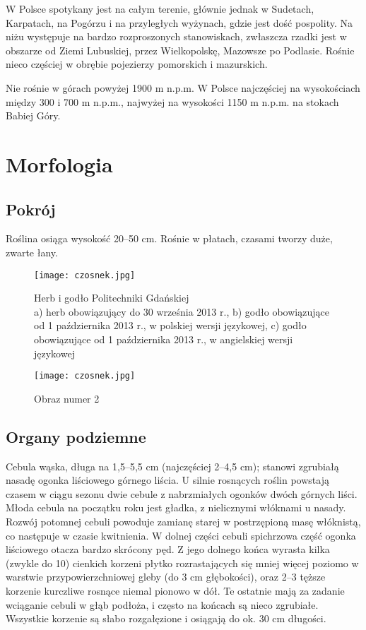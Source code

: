 W Polsce spotykany jest na całym terenie, głównie jednak w Sudetach, Karpatach, na Pogórzu i na przyległych wyżynach, gdzie jest dość pospolity. Na niżu występuje na bardzo rozproszonych stanowiskach, zwłaszcza rzadki jest w obszarze od Ziemi Lubuskiej, przez Wielkopolskę, Mazowsze po Podlasie. Rośnie nieco częściej w obrębie pojezierzy pomorskich i mazurskich.

Nie rośnie w górach powyżej 1900 m n.p.m. W Polsce najczęściej na wysokościach między 300 i 700 m n.p.m., najwyżej na wysokości 1150 m n.p.m. na stokach Babiej Góry.


\section{Morfologia}
\subsection{Pokrój}
Roślina osiąga wysokość 20–50 cm. Rośnie w płatach, czasami tworzy duże, zwarte łany.

\begin{figure}
 \centering
 \texttt{[image: czosnek.jpg]}
 \caption{Herb i godło Politechniki Gdańskiej\\
a) herb obowiązujący do 30 września 2013 r., b) godło obowiązujące od 1 października 2013 r., w polskiej wersji językowej, c) godło obowiązujące od 1 października 2013 r., w angielskiej wersji językowej}
 \label{figure:example}
\end{figure}

\begin{figure}
 \centering
 \texttt{[image: czosnek.jpg]}
 \caption{Obraz numer 2}
 \label{figure:example1}
\end{figure}

\subsection{Organy podziemne}
Cebula wąska, długa na 1,5–5,5 cm (najczęściej 2–4,5 cm); stanowi zgrubiałą nasadę ogonka liściowego górnego liścia. U silnie rosnących roślin powstają czasem w ciągu sezonu dwie cebule z nabrzmiałych ogonków dwóch górnych liści. Młoda cebula na początku roku jest gładka, z nielicznymi włóknami u nasady. Rozwój potomnej cebuli powoduje zamianę starej w postrzępioną masę włóknistą, co następuje w czasie kwitnienia. W dolnej części cebuli spichrzowa część ogonka liściowego otacza bardzo skrócony pęd. Z jego dolnego końca wyrasta kilka (zwykle do 10) cienkich korzeni płytko rozrastających się mniej więcej poziomo w warstwie przypowierzchniowej gleby (do 3 cm głębokości), oraz 2–3 tęższe korzenie kurczliwe rosnące niemal pionowo w dół. Te ostatnie mają za zadanie wciąganie cebuli w głąb podłoża, i często na końcach są nieco zgrubiałe. Wszystkie korzenie są słabo rozgałęzione i osiągają do ok. 30 cm długości.

